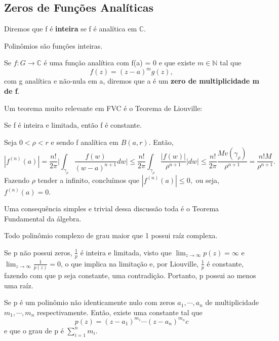 \documentclass[ComplexAnalysis/complex.tex]{subfiles}
\begin{document}
\subsection{Zeros de Funções Analíticas}
\begin{def*}
	Diremos que f é \textbf{inteira} se f é analítica em $\mathbb{C}$.
\end{def*}
\begin{example}
	Polin\^omios são funções inteiras.
\end{example}
\begin{def*}
	Se $f:G\rightarrow \mathbb{C}$ é uma função analítica com f(a) = 0 e que existe $m\in \mathbb{N}$ tal que
	$$
		f(z) = (z-a)^{m}g(z),
	$$
	com g analítica e não-nula em a, diremos que a é um \textbf{zero de multiplicidade m de f}.
\end{def*}
Um teorema muito relevante em FVC é o Teorema de Liouville:
\begin{theorem*}
	Se f é inteira e limitada, então f é constante.
\end{theorem*}
\begin{proof*}
	Seja $0 < \rho < r$ e sendo f analítica em $B(a, r)$. Então,
	$$
		|f^{(n)}(a)| = \frac{n!}{2 \pi}\biggl|\int_{\gamma_{\rho}}^{}\frac{f(w)}{(w-a)^{n+1}}dw\biggr|
		\leq \frac{n!}{2\pi}\int_{\gamma_{\rho}}^{}\frac{|f(w)|}{\rho^{n+1}}|dw| \leq \frac{n!}{2\pi}\frac{Mv(\gamma_{\rho})}{\rho^{n+1}} = \frac{n!M}{\rho^{n+1}}.
	$$
	Fazendo $\rho$ tender a infinito, concluímos que $|f^{(n)}(a)|\leq0,$ ou seja, $f^{(n)}(a) = 0.$
\end{proof*}
Uma consequência simples e trivial dessa discussão toda é o Teorema Fundamental da álgebra.
\begin{theorem*}
	Todo polin\^omio complexo de grau maior que 1 possui raíz complexa.
\end{theorem*}
\begin{proof*}
	Se p não possui zeros, $\frac{1}{p}$ é inteira e limitada, visto que $\lim_{z\to\infty}p(z) = \infty$ e $\lim_{z\to\infty}\frac{1}{p(z)} = 0$,
	o que implica na limitação e, por Liouville, $\frac{1}{p}$ é constante, fazendo com que p seja constante, uma contradição.
	Portanto, p possui ao menos uma raíz. \qedsymbol
\end{proof*}
\begin{crl*}
	Se p é um polin\^omio não identicamente nulo com zeros $a_1, \cdots, a_{n}$ de multiplicidade $m_1, \cdots, m_{n}$ respectivamente. Então,
	existe uma constante tal que
	$$
		p(z) = (z-a_1)^{m_1}\cdots(z-a_{n})^{m_{n}}c
	$$
	e que o grau de p é $\sum\limits_{i=1}^{n}m_{i}$.
\end{crl*}
\end{document}
